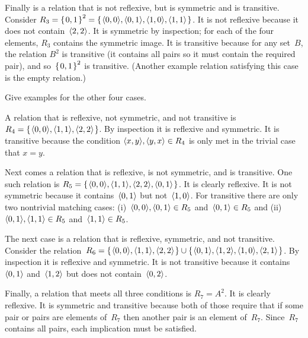\documentclass{ibl}  %
\begin{document}
\begin{problem}
\begin{exes}
\begin{answer}
  Finally is a relation that is not reflexive, but is symmetric and is 
  transitive.
  Consider $R_3=\mbox{$\{\hspace{0.1em}0,1\hspace{0.1em}\}$}^2
  =\mbox{$\{\hspace{0.1em}\langle0,0\rangle,\langle0,1\rangle,\langle1,0\rangle,\langle1,1\rangle\hspace{0.1em}\}$}$.
  It is not reflexive because it does not contain~$\langle2,2\rangle$.
  It is symmetric by inspection; for each of the four elements,
  $R_3$ contains the symmetric image.
  It is transitive because for any set~$B$, the relation $B^2$ is 
  transitive (it contains all pairs so it must contain the required pair), 
  and so~$\mbox{$\{\hspace{0.1em}0,1\hspace{0.1em}\}$}^2$ is transitive. 
  (Another example relation satisfying this case is the empty relation.)  
\end{answer}
\begin{exercise}
  Give examples for the other four cases.
\end{exercise}
\begin{answer}
  A relation that is reflexive, not symmetric, and not transitive is
  $R_4=\mbox{$\{\hspace{0.1em}\langle0,0\rangle,\langle1,1\rangle,\langle2,2\rangle\hspace{0.1em}\}$}$.
  By inspection it is  reflexive and symmetric.
  It is transitive because the condition  
  $\langle x,y\rangle,\langle y,x\rangle\in R_4$ is only met in the trivial case that
  $x=y$.

  Next comes a relation that is reflexive, is not symmetric, and is transitive.
  One such relation is 
  $R_5=\mbox{$\{\hspace{0.1em}\langle0,0\rangle, \langle1,1\rangle, \langle2,2\rangle, \langle0,1\rangle\hspace{0.1em}\}$}$.
  It is clearly reflexive.
  It is not symmetric because it contains~$\langle0,1\rangle$ but 
  not~$\langle1,0\rangle$.
  For transitive there are only two nontrivial matching cases:
  (i)~$\langle0,0\rangle,\langle0,1\rangle\in R_5$ and~$\langle0,1\rangle\in R_5$
  and
  (ii)~$\langle0,1\rangle,\langle1,1\rangle\in R_5$ and~$\langle1,1\rangle\in R_5$.

  The next case is 
  a relation that is reflexive, symmetric, and not transitive.
  Consider the relation~$R_6
  =\mbox{$\{\hspace{0.1em}\langle0,0\rangle, \langle1,1\rangle, \langle2,2\rangle\hspace{0.1em}\}$}
  \cup\mbox{$\{\hspace{0.1em}\langle0,1\rangle,\langle1,2\rangle,\langle1,0\rangle,\langle2,1\rangle\hspace{0.1em}\}$}$.
  By inspection it is reflexive and symmetric.
  It is not transitive because it contains $\langle0,1\rangle$ and~$\langle1,2\rangle$
  but does not contain~$\langle0,2\rangle$.

  Finally, a relation that meets all three conditions
  is $R_7=A^2$.
  It is clearly reflexive.
  It is symmetric and transitive because both of those require that 
  if some pair or pairs are elements of~$R_7$ then another 
  pair is an element of~$R_7$.
  Since~$R_7$ contains all pairs, each implication must be
  satisfied.
\end{answer}
\end{exes}
\end{problem}
\end{document}

